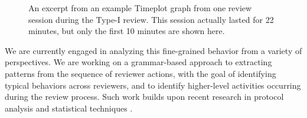 \begin{figure}

\caption{An excerpt from an example Timeplot graph from one review
session during the Type-I review. This session actually lasted for 
22 minutes, but only the first 10 minutes are shown here.}
\label{fig:timeplot}
\end{figure}

We are currently engaged in analyzing this fine-grained behavior from a
variety of perspectives.  We are working on a grammar-based approach to
extracting patterns from the sequence of reviewer actions, with the goal of
identifying typical behaviors across reviewers, and to identify
higher-level activities occurring during the review process.  Such work
builds upon recent research in protocol analysis \cite{Smith91} and
statistical techniques \cite{Gottman90}.
















 





